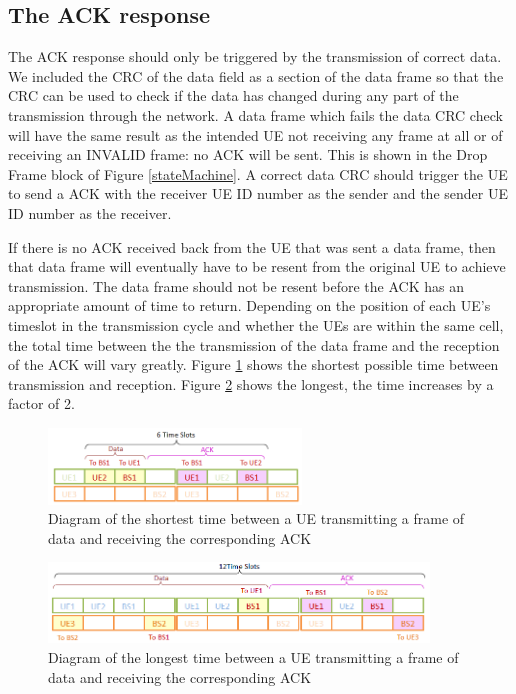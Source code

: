 \subsection {The ACK response }
The ACK response should only be triggered by the transmission of correct data. We included the CRC of the data field as a section of the data frame so that the CRC can be used to check if the data has changed during any part of the transmission through the network. A data frame which fails the data CRC check will have the same result as the intended UE not receiving any frame at all or of receiving an INVALID frame: no ACK will be sent. This is shown in the Drop Frame block of Figure \ref{stateMachine}. A correct data CRC should trigger the UE to send a ACK with the receiver UE ID number as the sender and the sender UE ID number as the receiver. 

If there is no ACK received back from the UE that was sent a data frame, then that data frame will eventually have to be resent from the original UE to achieve transmission. The data frame should not be resent before the ACK has an appropriate amount of time to return. Depending on the position of each UE's timeslot in the transmission cycle and whether the UEs are within the same cell, the total time between the the transmission of the data frame and the reception of the ACK will vary greatly. Figure \ref{fig:ACKtimeshort} shows the shortest possible time between transmission and reception. Figure \ref{fig:ACKtimelong} shows the longest, the time increases by a factor of 2. 

\begin{figure}[ht]
    \centering
    \includegraphics[width=0.6\textwidth]{ACK_timeout_short.PNG}
    \caption{Diagram of the shortest time between a UE transmitting a frame of data and receiving the corresponding ACK}
    \label{fig:ACKtimeshort}
\end{figure}

\begin{figure}[ht]
    \centering
    \includegraphics[width=0.9\textwidth]{ACK_timeout_long.PNG}
    \caption{Diagram of the longest time between a UE transmitting a frame of data and receiving the corresponding ACK}
    \label{fig:ACKtimelong}
\end{figure}

